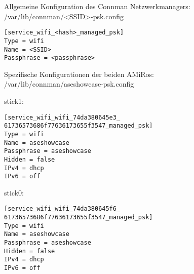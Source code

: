 Allgemeine Konfiguration des Connman Netzwerkmanagers:\\
/var/lib/connman/<SSID>-psk.config
\begin{lstlisting}
[service_wifi_<hash>_managed_psk]
Type = wifi
Name = <SSID>
Passphrase = <passphrase>
\end{lstlisting}

Spezifische Konfigurationen der beiden AMiRos:\\
/var/lib/connman/aseshowcase-psk.config

stick1:
\begin{lstlisting}
[service_wifi_wifi_74da380645e3_
61736573686f77636173655f3547_managed_psk]
Type = wifi
Name = aseshowcase
Passphrase = aseshowcase
Hidden = false
IPv4 = dhcp
IPv6 = off
\end{lstlisting}

stick0:
\begin{lstlisting}
[service_wifi_wifi_74da380645f6_
61736573686f77636173655f3547_managed_psk]
Type = wifi
Name = aseshowcase
Passphrase = aseshowcase
Hidden = false
IPv4 = dhcp
IPv6 = off
\end{lstlisting}

